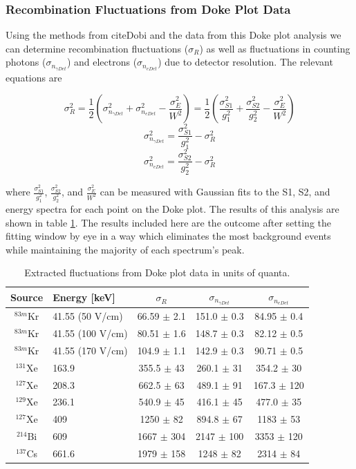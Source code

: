 \documentclass[a4paper,12pt]{article}
\begin{document}
{\newpage 

\subsubsection{Recombination Fluctuations from Doke Plot Data}

Using the methods from cite{Dobi} and the data from this Doke plot analysis we can determine recombination fluctuations ($\sigma_{R}$) as well as fluctuations in counting photons ($\sigma_{n_{\gamma Det}}$) and electrons ($\sigma_{n_{e Det}}$) due to detector resolution.  The relevant equations are

\[\sigma_{R}^2 = \frac{1}{2}( \sigma_{n_{\gamma Det}}^2 + \sigma_{n_{e Det}}^2 - \frac{\sigma_{E}^2}{W^2}) = \frac{1}{2}(\frac{\sigma_{S1}^2}{g_{1}^2} + \frac{\sigma_{S2}^2}{g_{2}^2} - \frac{\sigma_{E}^2}{W^2}) \]
\[ \sigma_{n_{\gamma Det}}^2 = \frac{\sigma_{S1}^2}{g_{1}^2} - \sigma_{R}^2 \]
\[ \sigma_{n_{e Det}}^2 = \frac{\sigma_{S2}^2}{g_{2}^2} - \sigma_{R}^2 \]


where $\frac{\sigma_{S1}^2}{g_{1}^2}$, $\frac{\sigma_{S2}^2}{g_{2}^2}$, and $\frac{\sigma_{E}^2}{W^2}$ can be measured with Gaussian fits to the S1, S2, and energy spectra for each point on the Doke plot.  The results of this analysis are shown in table \ref{SigR}.  The results included here are the outcome after setting the fitting window by eye in a way which eliminates the most background events while maintaining the majority of each spectrum's peak.  

\begin{center}
\begin{table}[H]
\begin{tabular}{ | c | p{40mm} | c | c | c | }
\hline
Source & Energy [keV] & $\sigma_{R}$ & $\sigma_{n_{\gamma Det}}$ & $\sigma_{n_{e Det}}$ \\ \hline
$^{83m}$Kr & 41.55 (50 V/cm) & 66.59 $\pm$ 2.1 & 151.0 $\pm$ 0.3 & 84.95 $\pm$ 0.4\\  \hline
$^{83m}$Kr & 41.55 (100 V/cm) & 80.51 $\pm$ 1.6 & 148.7 $\pm$ 0.3 & 82.12 $\pm$ 0.5\\  \hline
$^{83m}$Kr & 41.55 (170 V/cm) & 104.9 $\pm$ 1.1 & 142.9 $\pm$ 0.3 & 90.71 $\pm$ 0.5\\  \hline
$^{131}$Xe & 163.9 & 355.5 $\pm$ 43 & 260.1 $\pm$ 31 & 354.2 $\pm$ 30\\  \hline
$^{127}$Xe & 208.3 & 662.5 $\pm$ 63 & 489.1 $\pm$ 91 & 167.3 $\pm$ 120\\  \hline
$^{129}$Xe & 236.1 & 540.9 $\pm$ 45 & 416.1 $\pm$ 45 & 477.0 $\pm$ 35\\  \hline
$^{127}$Xe & 409 & 1250  $\pm$ 82 & 894.8 $\pm$ 67 & 1183 $\pm$ 53\\  \hline
$^{214}$Bi & 609 & 1667 $\pm$ 304 & 2147 $\pm$ 100 & 3353 $\pm$ 120\\  \hline
$^{137}$Cs & 661.6 & 1979 $\pm$ 158 & 1248 $\pm$ 82 & 2314 $\pm$ 84\\ 
\hline
\end{tabular}
\caption{Extracted fluctuations from Doke plot data in units of quanta.}
\label{SigR}
\end{table}
\end{center}


}
\end{document}
